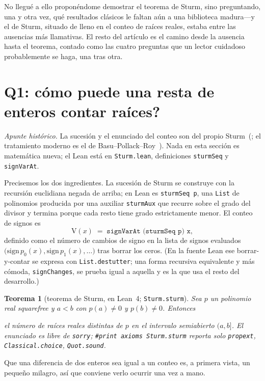 \documentclass[11pt]{article}
\newtheorem{theorem}{Teorema}
\newcommand{\lean}[1]{\texttt{#1}}
\newcommand{\V}{\mathrm{V}}
\newcommand{\keyeq}[1]{\begin{center}\keybox{$\displaystyle #1$}\end{center}}
\begin{document}
No llegu\'e a ello propon\'endome demostrar el teorema de Sturm, sino preguntando, una y otra vez,
qu\'e resultados cl\'asicos le faltan a\'un a una biblioteca madura---y el de Sturm, situado de lleno
en el conteo de ra\'ices reales, estaba entre las ausencias m\'as llamativas. El resto del art\'iculo
es el camino desde la ausencia hasta el teorema, contado como las cuatro preguntas que un lector
cuidadoso probablemente se haga, una tras otra.

\section{Q1: \textquestiondown c\'omo puede una resta de enteros contar ra\'ices?}\label{sec:q1}

\emph{Apunte hist\'orico.} La sucesi\'on y el enunciado del conteo son del propio
Sturm~(\cite{sturm}; el tratamiento moderno es el de Basu--Pollack--Roy~\cite{bpr}). Nada en esta
secci\'on es matem\'atica nueva; el Lean est\'a en \lean{Sturm.lean}, definiciones \lean{sturmSeq} y
\lean{signVarAt}.

Precisemos los dos ingredientes. La sucesi\'on de Sturm se construye con la recursi\'on euclidiana
negada de arriba; en Lean es \lean{sturmSeq p}, una \lean{List} de polinomios producida por una
auxiliar \lean{sturmAux} que recurre sobre el grado del divisor y termina porque cada resto tiene
grado estrictamente menor. El conteo de signos es
\[
  \V(x)\;=\;\lean{signVarAt (sturmSeq p) x},
\]
definido como el n\'umero de cambios de signo en la lista de signos evaluados
$\big(\mathrm{sign}\,p_0(x),\mathrm{sign}\,p_1(x),\dots\big)$ tras borrar los ceros. (En la fuente
Lean ese borrar-y-contar se expresa con \lean{List.destutter}; una forma recursiva equivalente y m\'as
c\'omoda, \lean{signChanges}, se prueba igual a aquella y es la que usa el resto del desarrollo.)

\begin{theorem}[teorema de Sturm, en Lean~4; \lean{Sturm.sturm}]\label{thm:sturm}
Sea $p$ un polinomio real squarefree y $a<b$ con $p(a)\ne0$ y $p(b)\ne0$. Entonces
\keyeq{\V(a)-\V(b)\;=\;\#\{x : a<x\le b,\ p(x)=0\},}
el n\'umero de ra\'ices reales \emph{distintas} de $p$ en el intervalo semiabierto $(a,b]$. El
enunciado es libre de \lean{sorry}; \lean{\#print axioms Sturm.sturm} reporta solo \lean{propext},
\lean{Classical.choice}, \lean{Quot.sound}.
\end{theorem}

Que una diferencia de dos enteros sea igual a un conteo es, a primera vista, un peque\~no milagro, as\'i
que conviene verlo ocurrir una vez a mano.
\end{document}
